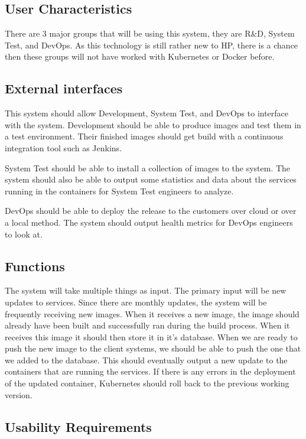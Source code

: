 \documentclass[onecolumn, draftclsnofoot,10pt, compsoc]{IEEEtran}
\begin{document}
\subsection{User Characteristics}

There are 3 major groups that will be using this system, they are R\&D, System Test, and DevOps. As this technology is still rather new to HP, there is a chance then these groups will not have worked with Kubernetes or Docker before.

\subsection{External interfaces}

This system should allow Development, System Test, and DevOps to interface with the system. Development should be able to produce images and test them in a test environment. Their finished images should get build with a continuous integration tool such as Jenkins. 

System Test should be able to install a collection of images to the system. The system should also be able to output some statistics and data about the services running in the containers for System Test engineers to analyze. 

DevOps should be able to deploy the release to the customers over cloud or over a local method. The system should output health metrics for DevOps engineers to look at. 

\subsection{Functions}

The system will take multiple things as input. The primary input will be new updates to services. Since there are monthly updates, the system will be frequently receiving new images. When it receives a new image, the image should already have been built and successfully ran during the build process. When it receives this image it should then store it in it’s database. When we are ready to push the new image to the client systems, we should be able to push the one that we added to the database. This should eventually output a new update to the containers that are running the services. If there is any errors in the deployment of the updated container, Kubernetes should roll back to the previous working version.



\subsection{Usability Requirements}
\end{document}
